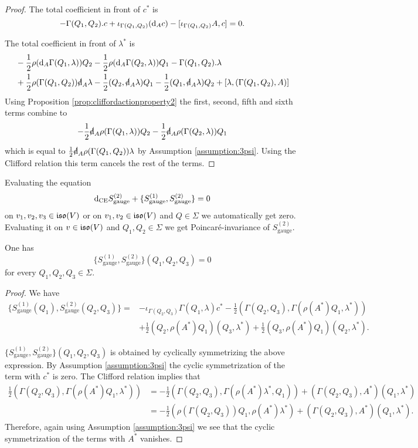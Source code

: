 \documentclass[10pt, oneside]{article}
\newcommand{\gauge}{\mathrm{gauge}}
\begin{document}
\begin{proof}
The total coefficient in front of $c^*$ is
\[-\Gamma(Q_1, Q_2).c + \iota_{\Gamma(Q_1, Q_2)}({\rm d}_A c) - [\iota_{\Gamma(Q_1, Q_2)} A, c] = 0.\]

The total coefficient in front of $\lambda^*$ is
\begin{align*}
&-\frac{1}{2}\rho(\d_A \Gamma(Q_1, \lambda))Q_2 -\frac{1}{2}\rho(\d_A \Gamma(Q_2, \lambda))Q_1 - \Gamma(Q_1, Q_2).\lambda \\
&+ \frac{1}{2}\rho(\Gamma(Q_1, Q_2))\sd{\d}_A\lambda - \frac{1}{2}(Q_2, \sd{\d}_A\lambda) Q_1 -\frac{1}{2}(Q_1, \sd{\d}_A\lambda) Q_2 + [\lambda, (\Gamma(Q_1, Q_2), A)]
\end{align*}
Using Proposition \ref{prop:cliffordactionproperty2} the first, second, fifth and sixth terms combine to
\[-\frac{1}{2} \sd{\d}_A\rho(\Gamma(Q_1, \lambda))Q_2 - \frac{1}{2} \sd{\d}_A\rho(\Gamma(Q_2, \lambda)) Q_1\]
which is equal to $\frac{1}{2} \sd{\d}_A \rho(\Gamma(Q_1, Q_2))\lambda$ by Assumption \ref{assumption:3psi}. Using the Clifford relation this term cancels the rest of the terms.
\end{proof}

Evaluating the equation
\[\d_{\mr{CE}} S_{\gauge}^{(2)} + \{S_{\gauge}^{(1)}, S_{\gauge}^{(2)}\} = 0\]
on $v_1, v_2, v_3\in\mathfrak{iso}(V)$ or on $v_1, v_2\in\mathfrak{iso}(V)$ and $Q\in\Sigma$ we automatically get zero. Evaluating it on $v\in\mathfrak{iso}(V)$ and $Q_1, Q_2\in\Sigma$ we get Poincar\'{e}-invariance of $S_{\gauge}^{(2)}$.

\begin{lemma}
One has
\[\{S_{\gauge}^{(1)}, S_{\gauge}^{(2)}\}(Q_1, Q_2, Q_3) = 0\]
for every $Q_1, Q_2, Q_3\in\Sigma$.
\label{lm:gaugemultiplet3}
\end{lemma}
\begin{proof}
We have
\begin{align*}
\{S_{\gauge}^{(1)}(Q_1), S_{\gauge}^{(2)}(Q_2, Q_3)\} = &-\iota_{\Gamma(Q_2, Q_3)}\Gamma(Q_1, \lambda) c^* - \frac{1}{2} (\Gamma(Q_2, Q_3), \Gamma(\rho(A^*) Q_1, \lambda^*)) \\
&+ \frac{1}{2}(Q_2, \rho(A^*)Q_1)(Q_3, \lambda^*) + \frac{1}{2}(Q_3, \rho(A^*) Q_1)(Q_2, \lambda^*).
\end{align*}

$\{S_{\gauge}^{(1)}, S_{\gauge}^{(2)}\}(Q_1, Q_2, Q_3)$ is obtained by cyclically symmetrizing the above expression. By Assumption \ref{assumption:3psi} the cyclic symmetrization of the term with $c^*$ is zero. The Clifford relation implies that
\begin{align*}
\frac{1}{2} (\Gamma(Q_2, Q_3), \Gamma(\rho(A^*) Q_1, \lambda^*)) &= -\frac{1}{2}(\Gamma(Q_2, Q_3), \Gamma(\rho(A^*)\lambda^*, Q_1)) + (\Gamma(Q_2, Q_3), A^*) (Q_1, \lambda^*) \\
&= -\frac{1}{2}(\rho(\Gamma(Q_2, Q_3)) Q_1, \rho(A^*)\lambda^*) + (\Gamma(Q_2, Q_3), A^*) (Q_1, \lambda^*).
\end{align*}
Therefore, again using Assumption \ref{assumption:3psi} we see that the cyclic symmetrization of the terms with $A^*$ vanishes.
\end{proof}
\end{document}
